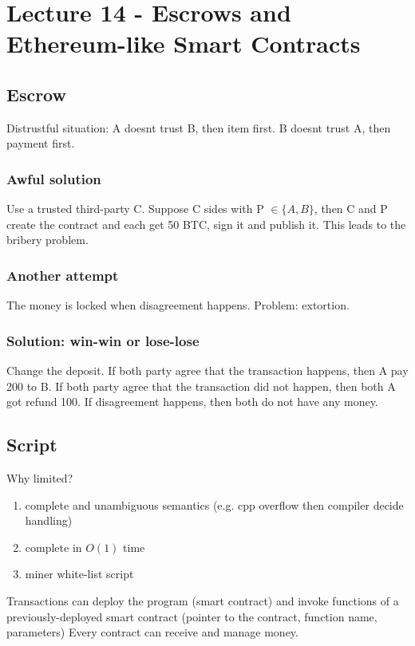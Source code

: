 \documentclass[../main.tex]{subfile}
\begin{document}
\newtheorem{theorem}{Theorem}
\newtheorem{example}{Example}[theorem]
\newtheorem{task}{Task}
\newtheorem{definition}{Definition}
\section{Lecture 14 - Escrows and Ethereum-like Smart Contracts}
\subsection{Escrow}
Distrustful situation: A doesnt trust B, then item first. B doesnt trust A, then payment first.
\subsubsection{Awful solution} Use a trusted third-party C. Suppose C sides with P $\in \{A,B\}$, then C and P create the contract and each get 50 BTC, sign it and publish it. 
This leads to the bribery problem. 
\subsubsection{Another attempt}
The money is locked when disagreement happens. Problem: extortion.
\subsubsection{Solution: win-win or lose-lose}
Change the deposit. If both party agree that the transaction happens, then A pay 200 to B. If both party agree that the transaction did not happen, then both A got refund 100. If disagreement happens, then both do not have any money. 
\subsection{Script}
Why limited?
\begin{enumerate}
	\item complete and unambiguous semantics (e.g. cpp overflow then compiler decide handling)
	\item complete in $O(1)$ time
	\item miner white-list script
\end{enumerate}
Transactions can deploy the program (smart contract) and invoke functions of a previously-deployed smart contract (pointer to the contract, function name, parameters)
Every contract can receive and manage money.
\end{document}
